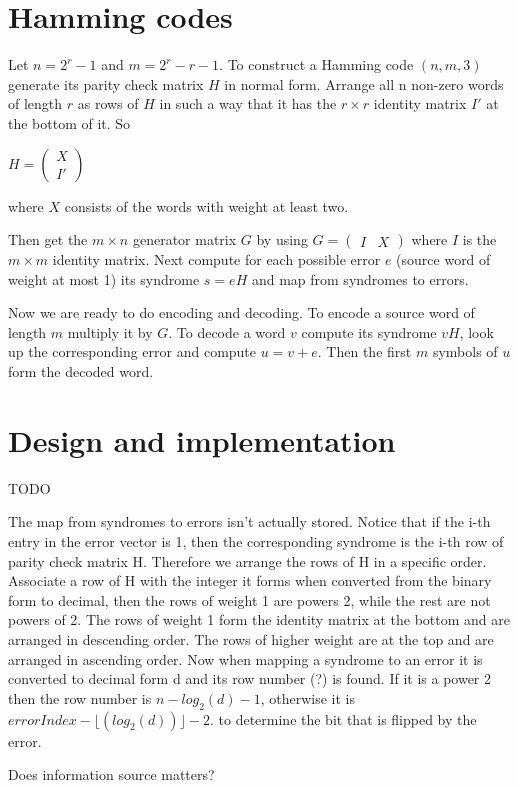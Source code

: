 \documentclass{article}
\begin{document}
\section{Hamming codes}

Let $n=2^r-1$ and $m=2^r-r-1$. To construct a Hamming code $(n, m, 3)$ generate its parity check matrix $H$ in normal form. Arrange all n non-zero words of length $r$ as rows of $H$ in such a way that it has the $r \times r$ identity matrix $I'$ at the bottom of it. So

\begin{center}
$
H =
\begin{pmatrix}
  X \\
  I'
\end{pmatrix}
$
\end{center}
where $X$ consists of the words with weight at least two.


Then get the $m \times n$ generator matrix $G$ by using
$
G =
\begin{pmatrix}
  I & X
\end{pmatrix}
$
where $I$ is the $m \times m$ identity matrix. Next compute for each possible error $e$ (source word of weight at most 1) its syndrome $s=eH$ and map from syndromes to errors.

Now we are ready to do encoding and decoding. To encode a source word of length $m$ multiply it by $G$. To decode a word $v$ compute its syndrome $vH$, look up the corresponding error and compute $u=v+e$. Then the first $m$ symbols of $u$ form the decoded word.


\section{Design and implementation}

TODO

The map from syndromes to errors isn't actually stored. Notice that if the i-th entry in the error vector is 1, then the corresponding syndrome is the i-th row of parity check matrix H. Therefore we arrange the rows of H in a specific order. Associate a row of H with the integer it forms when converted from the binary form to decimal, then the rows of weight 1 are powers 2, while the rest are not powers of 2. The rows of weight 1 form the identity matrix at the bottom and are arranged in descending order. The rows of higher weight are at the top and are arranged in ascending order. Now when mapping a syndrome to an error it is converted to decimal form d and its row number (?) is found. If it is a power 2 then the row number is $n - log_2(d) - 1$, otherwise it is $errorIndex - \lfloor(log_2(d))\rfloor - 2$.
 to determine the bit that is flipped by the error.
 
 Does information source matters?
\end{document}

